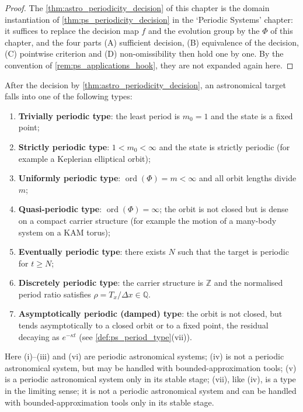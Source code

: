\begin{proof}
The \cref{thm:astro_periodicity_decision} of this chapter is the domain instantiation of \cref{thm:ps_periodicity_decision} in the `Periodic Systems' chapter:
it suffices to replace the decision map $f$ and the evolution group by the $\Phi$ of this chapter, and the four parts (A) sufficient decision, (B) equivalence of the decision, (C) pointwise criterion and
(D) non-omissibility then hold one by one. By the convention of \cref{rem:ps_applications_hook}, they are not expanded again here.
\end{proof}

\begin{corollary}\label{cor:astro_period_type}
After the decision by \cref{thm:astro_periodicity_decision}, an astronomical target falls into one of the following types:
\begin{enumerate}[label=(\roman*)]
    \item \textbf{Trivially periodic type}: the least period is \(m_0=1\) and the state is a fixed point;
    \item \textbf{Strictly periodic type}: \(1<m_0<\infty\) and the state is strictly periodic (for example a Keplerian elliptical orbit);
    \item \textbf{Uniformly periodic type}: \(\operatorname{ord}(\Phi)=m<\infty\) and all orbit lengths divide \(m\);
    \item \textbf{Quasi-periodic type}: \(\operatorname{ord}(\Phi)=\infty\); the orbit is not closed but is dense on a compact carrier structure (for example the motion of a many-body system on a KAM torus);
    \item \textbf{Eventually periodic type}: there exists \(N\) such that the target is periodic for \(t\ge N\);
    \item \textbf{Discretely periodic type}: the carrier structure is \(\mathbb Z\) and the normalised period ratio satisfies \(\rho=T_x/\Delta x\in\mathbb Q\).
    \item \textbf{Asymptotically periodic (damped) type}: the orbit is not closed, but tends asymptotically to a closed orbit or to a fixed point, the residual decaying as \(e^{-\kappa t}\) (see \cref{def:ps_period_type}(vii)).
\end{enumerate}
Here (i)--(iii) and (vi) are periodic astronomical systems; (iv) is not a periodic astronomical system, but may be handled with bounded-approximation tools; (v) is a periodic astronomical system only in its stable stage; (vii), like (iv), is a type in the limiting sense; it is not a periodic astronomical system and can be handled with bounded-approximation tools only in its stable stage.
\end{corollary}


